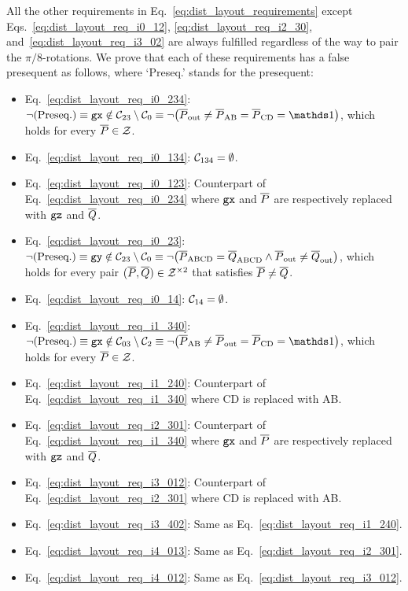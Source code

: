 \documentclass[
 prx,
 reprint,
 superscriptaddress,
 longbibliography,
 dvipsnames
]{revtex4-2}
\begin{document}
\begin{widetext}
All the other requirements in Eq.~\eqref{eq:dist_layout_requirements} except Eqs.~\eqref{eq:dist_layout_req_i0_12}, \eqref{eq:dist_layout_req_i2_30}, and~\eqref{eq:dist_layout_req_i3_02} are always fulfilled regardless of the way to pair the $\pi/8$-rotations.
We prove that each of these requirements has a false presequent as follows, where `Preseq.' stands for the presequent:
\begin{itemize}
    \item Eq.~\eqref{eq:dist_layout_req_i0_234}: $\neg\text{(Preseq.)} \equiv \gx \notin \condsete{23}\setminus\condsete{0} \equiv \neg\qty(\lgc{P}_\mr{out} \neq \lgc{P}_\mr{AB} = \lgc{P}_\mr{CD} = \identity)$, which holds for every $\overline{P} \in \mathcal{Z}$.
    \item Eq.~\eqref{eq:dist_layout_req_i0_134}: $\mathcal{C}_{134} = \emptyset$.
    \item Eq.~\eqref{eq:dist_layout_req_i0_123}: Counterpart of Eq.~\eqref{eq:dist_layout_req_i0_234} where $\texttt{gx}$ and $\overline{P}$ are respectively replaced with $\texttt{gz}$ and $\overline{Q}$.
    \item Eq.~\eqref{eq:dist_layout_req_i0_23}: $\neg\text{(Preseq.)} \equiv \texttt{gy} \notin \mathcal{C}_{23} \setminus \mathcal{C}_{0} \equiv \neg\qty( \overline{P}_{\mathrm{ABCD}} = \overline{Q}_{\mathrm{ABCD}} \land \overline{P}_{\mathrm{out}} \neq \overline{Q}_{\mathrm{out}})$, which holds for every pair $(\overline{P}, \overline{Q}) \in \mathcal{Z}^{\times 2}$ that satisfies $\overline{P} \neq \overline{Q}$.
    \item Eq.~\eqref{eq:dist_layout_req_i0_14}: $\mathcal{C}_{14} = \emptyset$.
    \item Eq.~\eqref{eq:dist_layout_req_i1_340}: $\neg\text{(Preseq.)} \equiv \gx \notin \condsete{03}\setminus\condsete{2} \equiv \neg\qty(\lgc{P}_\mr{AB} \neq \lgc{P}_\mr{out} = \lgc{P}_\mr{CD} = \identity)$, which holds for every $\overline{P} \in \mathcal{Z}$.
    \item Eq.~\eqref{eq:dist_layout_req_i1_240}: Counterpart of Eq.~\eqref{eq:dist_layout_req_i1_340} where CD is replaced with AB.
    \item Eq.~\eqref{eq:dist_layout_req_i2_301}: Counterpart of Eq.~\eqref{eq:dist_layout_req_i1_340} where $\texttt{gx}$ and $\overline{P}$ are respectively replaced with $\texttt{gz}$ and $\overline{Q}$.
    \item Eq.~\eqref{eq:dist_layout_req_i3_012}: Counterpart of Eq.~\eqref{eq:dist_layout_req_i2_301} where CD is replaced with AB.
    \item Eq.~\eqref{eq:dist_layout_req_i3_402}: Same as Eq.~\eqref{eq:dist_layout_req_i1_240}.
    \item Eq.~\eqref{eq:dist_layout_req_i4_013}: Same as Eq.~\eqref{eq:dist_layout_req_i2_301}.
    \item Eq.~\eqref{eq:dist_layout_req_i4_012}: Same as Eq.~\eqref{eq:dist_layout_req_i3_012}.
\end{itemize}


\end{widetext}
\end{document}
